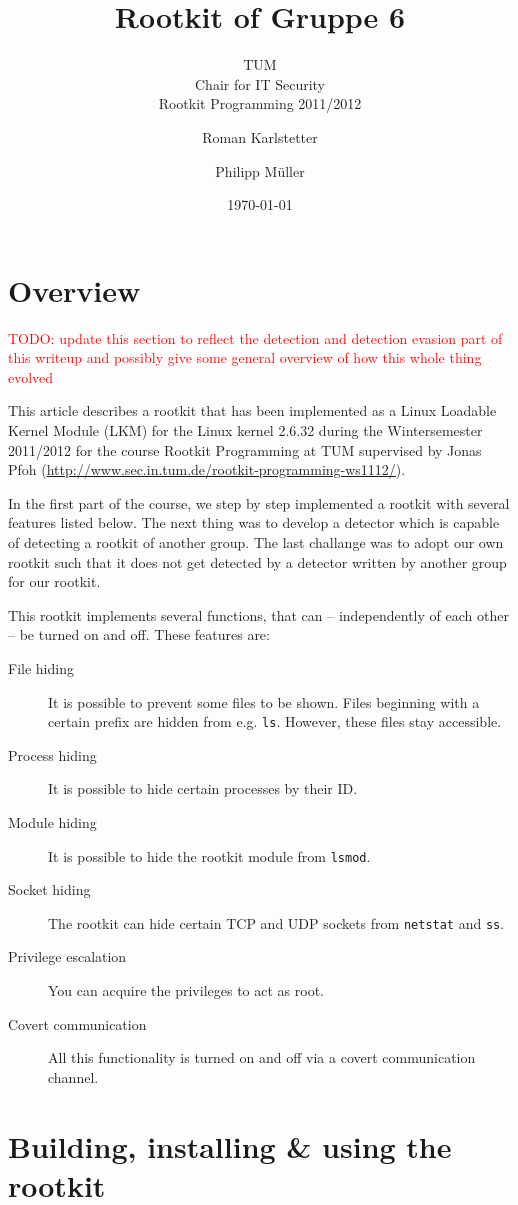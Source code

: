 \documentclass[10pt, letterpaper]{scrartcl}
\title{Rootkit of Gruppe 6}
\subtitle{TUM \\Chair for IT Security\\  Rootkit Programming 2011/2012}
\author{Roman Karlstetter \and Philipp M\"uller}
\date{\today}
\newcommand{\todo}[1]{\textcolor{red}{TODO: #1}}
\begin{document}
\maketitle

\section{Overview}
\todo{update this section to reflect the detection and detection evasion part of this writeup and possibly give some general overview of how this whole thing evolved}


This article describes a rootkit that has been implemented as a Linux Loadable Kernel Module (LKM) for the Linux kernel 2.6.32 during the Wintersemester 2011/2012 for the course Rootkit Programming at TUM supervised by Jonas Pfoh (\url{http://www.sec.in.tum.de/rootkit-programming-ws1112/}). 

In the first part of the course, we step by step implemented a rootkit with several features listed below. The next thing was to develop a detector which is capable of detecting a rootkit of another group. The last challange was to adopt our own rootkit such that it does not get detected by a detector written by another group for our rootkit.

This rootkit implements several functions, that can -- independently of each other -- be turned on and off. These features are:

\begin{description}
\item [File hiding] It is possible to prevent some files to be shown. Files beginning with a certain prefix are hidden from e.g. \texttt{ls}. However, these files stay accessible.
\item [Process hiding] It is possible to hide certain processes by their ID.
\item [Module hiding] It is possible to hide the rootkit module from \texttt{lsmod}.
\item [Socket hiding] The rootkit can hide certain TCP and UDP sockets from \texttt{netstat} and \texttt{ss}.
\item [Privilege escalation] You can acquire the privileges to act as root.
\item [Covert communication] All this functionality is turned on and off via a covert communication channel.
\end{description}

\section{Building, installing \& using the rootkit}
\end{document}
